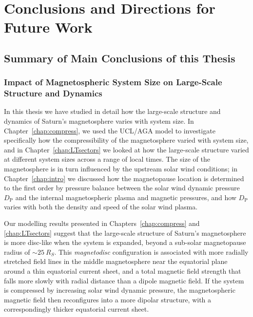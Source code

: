 \chapter{Conclusions and Directions for Future Work}
\label{chap:conclusions}
\section{Summary of Main Conclusions of this Thesis}
\subsection{Impact of Magnetospheric System Size on Large-Scale Structure and Dynamics}
In this thesis we have studied in detail how the large-scale structure and dynamics of Saturn's magnetosphere varies with system size. In Chapter~\ref{chap:compress}, we used the UCL/AGA model to investigate specifically how the compressibility of the magnetosphere varied with system size, and in Chapter~\ref{chap:LTsectors} we looked at how the large-scale structure varied at different system sizes across a range of local times. The size of the magnetosphere is in turn influenced by the upstream solar wind conditions; in Chapter~\ref{chap:intro} we discussed how the magnetopause location is determined to the first order by pressure balance between the solar wind dynamic pressure $D_\mathrm{P}$ and the internal magnetospheric plasma and magnetic pressures, and how $D_\mathrm{P}$ varies with both the density and speed of the solar wind plasma.

Our modelling results presented in Chapters~\ref{chap:compress} and \ref{chap:LTsectors} suggest that the large-scale structure of Saturn's magnetosphere is more disc-like when the system is expanded, beyond a sub-solar magnetopause radius of ${\sim}\SI{25}{R_S}$. This \textit{magnetodisc} configuration is associated with more radially stretched field lines in the middle magnetosphere near the equatorial plane around a thin equatorial current sheet, and a total magnetic field strength that falls more slowly with radial distance than a dipole magnetic field. If the system is compressed by increasing solar wind dynamic pressure, the magnetospheric magnetic field then reconfigures into a more dipolar structure, with a correspondingly thicker equatorial current sheet. 

